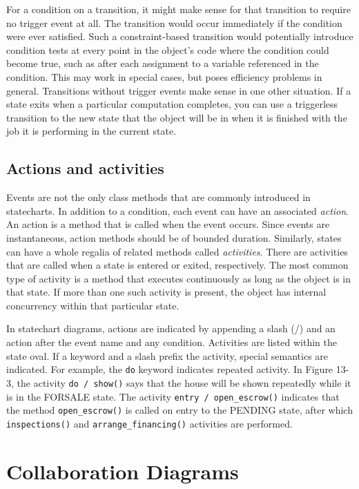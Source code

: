 For a condition on a transition, it might make sense for that
transition to require no trigger event at all. The transition would
occur immediately if the condition were ever satisfied. Such a
constraint-based transition would potentially introduce condition tests
at every point in the object's code where the
condition could become true, such as after each assignment to a
variable referenced in the condition. This may work in special
cases, but poses efficiency problems in general. Transitions without
trigger events make sense in one other situation. If a state exits when
a particular computation completes, you can use a triggerless
transition to the new state that the object will be in when it is
finished with the job it is performing in the current state.

\subsection*{Actions and activities}

Events are not the only class methods that are commonly introduced in
statecharts. In addition to a condition, each event can have an
associated \textit{action}. An action is a
method that is called when the event occurs. Since events are
instantaneous, action methods should be of bounded duration.
Similarly, states can have a whole regalia of related methods called
\textit{activities}. There are activities
that are called when a state is entered or exited, respectively. The
most common type of activity is a method that executes continuously as
long as the object is in that state. If more than one such activity is
present, the object has internal concurrency within that particular
state.

In statechart diagrams, actions are indicated by appending a slash (/)
and an action after the event name and any
condition. Activities are listed within the state
oval. If a keyword and a slash prefix the activity, special semantics
are indicated. For example, the \texttt{do} keyword indicates
repeated activity. In Figure 13-3, the activity
\texttt{do / show()} says that the house will be shown repeatedly
while it is in the FORSALE state. The activity \texttt{entry /
open\_escrow()} indicates that the method \texttt{open\_escrow()} is
called on entry to the PENDING state, after which
\texttt{inspections()} and \texttt{arrange\_financing()} activities are
performed.

\section{Collaboration Diagrams}

